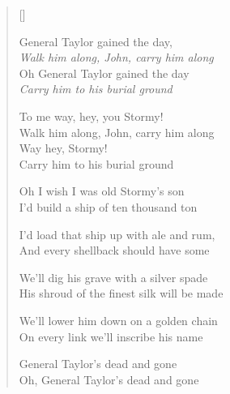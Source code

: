 \pagebreak
\settowidth{\versewidth}{We'll dig his grave with a silver spade}
\begin{verse}[\versewidth]
\begin{patverse}
General Taylor gained the day,\\
\textit{Walk him along, John, carry him along}\\
Oh General Taylor gained the day\\
\textit{Carry him to his burial ground}
\end{patverse}


\begin{chorus}
To me way, hey, you Stormy!\\
Walk him along, John, carry him along\\
Way hey, Stormy!\\
Carry him to his burial ground
\end{chorus}

Oh I wish I was old Stormy's son\\
I'd build a ship of ten thousand ton

I'd load that ship up with ale and rum,\\
And every shellback should have some

We'll dig his grave with a silver spade\\
His shroud of the finest silk will be made

We'll lower him down on a golden chain\\
On every link we'll inscribe his name

General Taylor's dead and gone\\
Oh, General Taylor's dead and gone

\end{verse}
